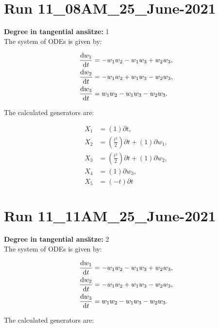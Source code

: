 \section*{Run 11\_08AM\_25\_June-2021}
\textbf{Degree in tangential ansätze:}	1\\
The system of ODEs is given by:

\begin{align*}
\dv{w_{1}}{t}&=- w_{1} w_{2} - w_{1} w_{3} + w_{2} w_{3},\\
\dv{w_{2}}{t}&=- w_{1} w_{2} + w_{1} w_{3} - w_{2} w_{3},\\
\dv{w_{3}}{t}&=w_{1} w_{2} - w_{1} w_{3} - w_{2} w_{3}.\\
\end{align*}

\noindent The calculated generators are:

\begin{align*}
X_{1}&=\left( 1 \right)\partial t,\\
X_{2}&=\left( \frac{t^{2}}{2} \right)\partial t+\left( 1 \right)\partial w_{1},\\
X_{3}&=\left( \frac{t^{2}}{2} \right)\partial t+\left( 1 \right)\partial w_{2},\\
X_{4}&=\left( 1 \right)\partial w_{3},\\
X_{5}&=\left( - t \right)\partial t\end{align*}
\section*{Run 11\_11AM\_25\_June-2021}
\textbf{Degree in tangential ansätze:}	2\\
The system of ODEs is given by:

\begin{align*}
\dv{w_{1}}{t}&=- w_{1} w_{2} - w_{1} w_{3} + w_{2} w_{3},\\
\dv{w_{2}}{t}&=- w_{1} w_{2} + w_{1} w_{3} - w_{2} w_{3},\\
\dv{w_{3}}{t}&=w_{1} w_{2} - w_{1} w_{3} - w_{2} w_{3}.\\
\end{align*}

\noindent The calculated generators are:

